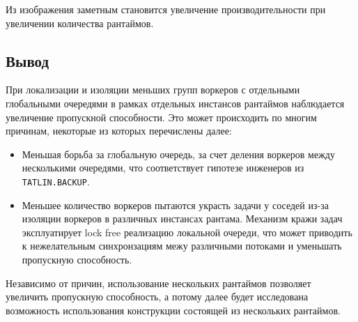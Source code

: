 Из изображения заметным становится увеличение производительности при увеличении количества рантаймов.

\subsection{Вывод}

При локализации и изоляции меньших групп воркеров с отдельными глобальными очередями в рамках отдельных инстансов рантаймов наблюдается увеличение пропускной способности. Это может происходить по многим причинам, некоторые из которых перечислены далее:

\begin{itemize}
    \item Меньшая борьба за глобальную очередь, за счет деления воркеров между несколькими очередями, что соответствует гипотезе инженеров из \verb|TATLIN.BACKUP|.
    \item Меньшее количество воркеров пытаются украсть задачи у соседей из-за изоляции воркеров в различных инстансах рантама. Механизм кражи задач эксплуатирует lock free реализацию локальной очереди, что может приводить к нежелательным синхронзациям межу различными потоками и уменьшать пропускную способность.
\end{itemize}

Независимо от причин, использование нескольких рантаймов позволяет увеличить пропускную способность, а потому далее будет исследована возможность использования конструкции состоящей из нескольких рантаймов.

